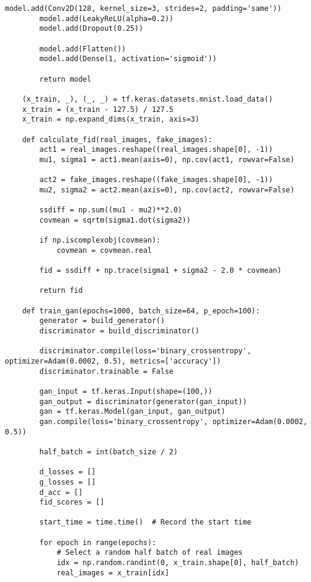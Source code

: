 \begin{lstlisting}[style=mypython, caption= {Explore GAN with 5 Convolutional Layers in Generator \\ and 3 Convolutional Layers in Discriminator}]
        model.add(Conv2D(128, kernel_size=3, strides=2, padding='same'))
        model.add(LeakyReLU(alpha=0.2))
        model.add(Dropout(0.25))
    
        model.add(Flatten())
        model.add(Dense(1, activation='sigmoid'))
    
        return model
    
    (x_train, _), (_, _) = tf.keras.datasets.mnist.load_data()
    x_train = (x_train - 127.5) / 127.5
    x_train = np.expand_dims(x_train, axis=3)
    
    def calculate_fid(real_images, fake_images):
        act1 = real_images.reshape((real_images.shape[0], -1))
        mu1, sigma1 = act1.mean(axis=0), np.cov(act1, rowvar=False)
        
        act2 = fake_images.reshape((fake_images.shape[0], -1))
        mu2, sigma2 = act2.mean(axis=0), np.cov(act2, rowvar=False)
        
        ssdiff = np.sum((mu1 - mu2)**2.0)
        covmean = sqrtm(sigma1.dot(sigma2))
        
        if np.iscomplexobj(covmean):
            covmean = covmean.real
        
        fid = ssdiff + np.trace(sigma1 + sigma2 - 2.0 * covmean)
        
        return fid
    
    def train_gan(epochs=1000, batch_size=64, p_epoch=100):
        generator = build_generator()
        discriminator = build_discriminator()
    
        discriminator.compile(loss='binary_crossentropy', optimizer=Adam(0.0002, 0.5), metrics=['accuracy'])
        discriminator.trainable = False
    
        gan_input = tf.keras.Input(shape=(100,))
        gan_output = discriminator(generator(gan_input))
        gan = tf.keras.Model(gan_input, gan_output)
        gan.compile(loss='binary_crossentropy', optimizer=Adam(0.0002, 0.5))
    
        half_batch = int(batch_size / 2)
        
        d_losses = []
        g_losses = []
        d_acc = []
        fid_scores = []
        
        start_time = time.time()  # Record the start time
    
        for epoch in range(epochs):
            # Select a random half batch of real images
            idx = np.random.randint(0, x_train.shape[0], half_batch)
            real_images = x_train[idx]
    

\end{lstlisting}
